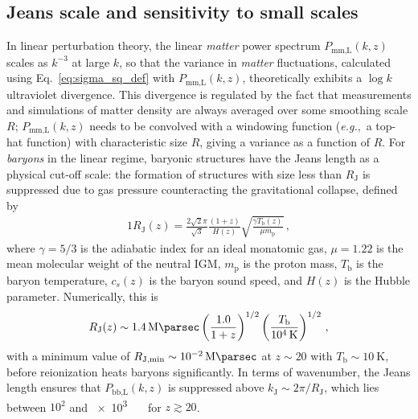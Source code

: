 \documentclass[prd,aps,10pt,nofootinbib,twocolumn,superscriptaddress,preprintnumbers,balancelastpage,longbibliography]{revtex4-1}
\begin{document}
\subsection{Jeans scale and sensitivity to small scales}
\label{sec:jeans_scale}

In linear perturbation theory, the linear \textit{matter} power spectrum $P_\text{mm,L}(k,z)$ scales as $k^{-3}$ at large $k$, so that the variance in \textit{matter} fluctuations, calculated using Eq.~\eqref{eq:sigma_sq_def} with $P_\text{mm,L}(k,z)$, theoretically exhibits a $\log k$ ultraviolet divergence. 
This divergence is regulated by the fact that measurements and simulations of matter density are always averaged over some smoothing scale $R$; $P_\text{mm,L}(k,z)$ needs to be convolved with a windowing function (\emph{e.g.},\ a top-hat function) with characteristic size $R$, giving a variance as a function of $R$. 
For \textit{baryons} in the linear regime, baryonic structures have the Jeans length as a physical cut-off scale: the formation of structures with size less than $R_\text{J}$ is suppressed due to gas pressure counteracting the gravitational collapse, defined by
%
\begin{alignat}{1}
     R_\text{J}(z) = \frac{2 \sqrt{2} \pi}{\sqrt{3}} \frac{(1+z)}{H(z)} \sqrt{\frac{\gamma T_\text{b}(z)}{\mu m_\text{p}}} \,,
     \label{eq:jeans_length}
\end{alignat}
%
where $\gamma = 5/3$ is the adiabatic index for an ideal monatomic gas, $\mu = 1.22$ is the mean molecular weight of the neutral IGM, $m_\text{p}$ is the proton mass, $T_\text{b}$ is the baryon temperature, $c_s(z)$ is the baryon sound speed, and $H(z)$ is the Hubble parameter. 
Numerically, this is
%
\begin{alignat}{1}
    R_\text{J}(z) \sim \SI{1.4}{\mega\parsec} \left(\frac{1.0}{1+z}\right)^{1/2} \left(\frac{T_\text{b}}{\SI{e4}{\kelvin}}\right)^{1/2} \,,
    \label{eq:jeans_length_numeric}
\end{alignat}
%
with a minimum value of $R_\text{J,min} \sim \SI{e-2}{\mega\parsec}$ at $z \sim 20$ with $T_\text{b} \sim \SI{10}{\kelvin}$, before reionization heats baryons significantly. 
In terms of wavenumber, the Jeans length ensures that $P_\text{bb,L}(k,z)$ is suppressed above $k_\text{J} \sim 2 \pi / R_\text{J}$, which lies between $10^2$ and \SI{e3}{\per\mega\parsec} for $z \gtrsim 20$. 
\end{document}
